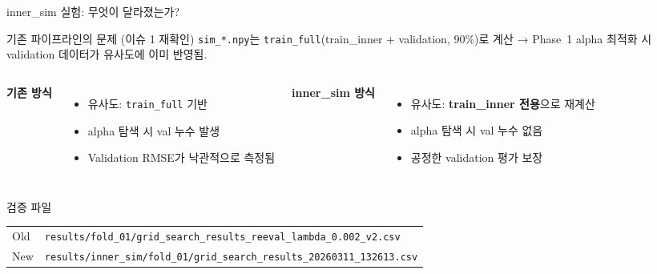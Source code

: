 \documentclass[aspectratio=169,10pt]{beamer}
\begin{document}
\begin{frame}{inner\_sim 실험: 무엇이 달라졌는가?}
	\begin{alertblock}{기존 파이프라인의 문제 (이슈 1 재확인)}
		\texttt{sim\_*.npy}는 \texttt{train\_full}(train\_inner + validation, 90\%)로
		계산 → Phase~1 alpha 최적화 시 validation 데이터가 유사도에 이미 반영됨.
	\end{alertblock}

	\vspace{0.4em}
	\begin{columns}[T]
			\textbf{기존 방식}
			\begin{itemize}
				\item 유사도: \texttt{train\_full} 기반
				\item alpha 탐색 시 val 누수 발생
				\item Validation RMSE가 낙관적으로 측정됨
			\end{itemize}

			\textbf{inner\_sim 방식}
			\begin{itemize}
				\item 유사도: \textbf{train\_inner 전용}으로 재계산
				\item alpha 탐색 시 val 누수 없음
				\item 공정한 validation 평가 보장
			\end{itemize}
	\end{columns}

	\vspace{0.5em}
	\begin{block}{검증 파일}
		\begin{tabular}{l|l}
			Old & \texttt{results/fold\_01/grid\_search\_results\_reeval\_lambda\_0.002\_v2.csv}\\
			New & \texttt{results/inner\_sim/fold\_01/grid\_search\_results\_20260311\_132613.csv}
		\end{tabular}
	\end{block}
\end{frame}
\end{document}
